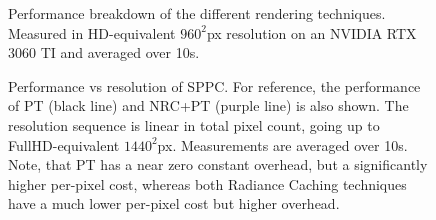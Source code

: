 \begin{figure}
    \centering
    
    \caption{Performance breakdown of the different rendering techniques. Measured in HD-equivalent $960^2$px resolution on an NVIDIA RTX 3060 TI and averaged over 10s.}
    \label{fig:breakdown}
\end{figure}

\begin{figure}
    \centering
    
    \caption{Performance vs resolution of SPPC. For reference, the performance of PT (black line) and NRC+PT (purple line) is also shown. The resolution sequence is linear in total pixel count, going up to FullHD-equivalent $1440^2$px. Measurements are averaged over 10s. Note, that PT has a near zero constant overhead, but a significantly higher per-pixel cost, whereas both Radiance Caching techniques have a much lower per-pixel cost but higher overhead.}
    \label{fig:perres}
\end{figure}